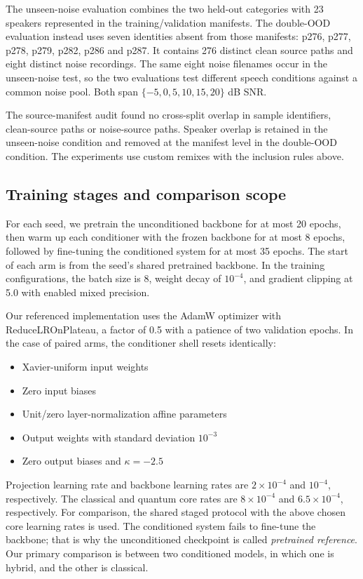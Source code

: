 \documentclass[10pt,a4paper]{article}
\begin{document}
The unseen-noise evaluation combines the two held-out categories with 23 speakers represented in the training/validation manifests. The double-OOD evaluation instead uses seven identities absent from those manifests: p276, p277, p278, p279, p282, p286 and p287. It contains 276 distinct clean source paths and eight distinct noise recordings. The same eight noise filenames occur in the unseen-noise test, so the two evaluations test different speech conditions against a common noise pool. Both span $\{-5,0,5,10,15,20\}$ dB SNR.

The source-manifest audit found no cross-split overlap in sample identifiers, clean-source paths or noise-source paths. Speaker overlap is retained in the unseen-noise condition and removed at the manifest level in the double-OOD condition. The experiments use custom remixes with the inclusion rules above.

\subsection{Training stages and comparison scope}
For each seed, we pretrain the unconditioned backbone for at most 20 epochs, then warm up each conditioner with the frozen backbone for at most 8 epochs, followed by fine-tuning the conditioned system for at most 35 epochs. The start of each arm is from the seed's shared pretrained backbone. In the training configurations, the batch size is 8, weight decay of $10^{-4}$, and gradient clipping at 5.0 with enabled mixed precision. 

Our referenced implementation uses the AdamW optimizer with ReduceLROnPlateau, a factor of 0.5 with a patience of two validation epochs. In the case of paired arms, the conditioner shell resets identically:
\begin{itemize}
	\item Xavier-uniform input weights
	\item Zero input biases
	\item Unit/zero layer-normalization affine parameters
	\item Output weights with standard deviation $10^{-3}$
	\item Zero output biases and $\kappa=-2.5$
\end{itemize}
Projection learning rate and backbone learning rates are $2\times10^{-4}$ and $10^{-4}$, respectively. The classical and quantum core rates are $8\times10^{-4}$ and $6.5\times10^{-4}$, respectively. For comparison, the shared staged protocol with the above chosen core learning rates is used. The conditioned system fails to fine-tune the backbone; that is why the unconditioned checkpoint is called \emph{pretrained reference}. Our primary comparison is between two conditioned models, in which one is hybrid, and the other is classical. 
\end{document}
